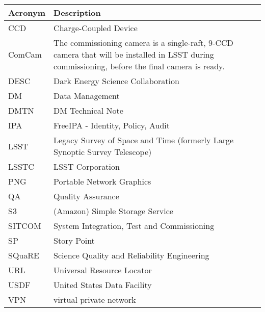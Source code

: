 \addtocounter{table}{-1}
\begin{longtable}{p{}p{}}\hline
\textbf{Acronym} & \textbf{Description}  \\\hline

CCD & Charge-Coupled Device \\\hline
ComCam & The commissioning camera is a single-raft, 9-CCD camera that will be installed in LSST during commissioning, before the final camera is ready. \\\hline
DESC & Dark Energy Science Collaboration \\\hline
DM & Data Management \\\hline
DMTN & DM Technical Note \\\hline
IPA & FreeIPA - Identity, Policy, Audit \\\hline
LSST & Legacy Survey of Space and Time (formerly Large Synoptic Survey Telescope) \\\hline
LSSTC & LSST Corporation \\\hline
PNG & Portable Network Graphics \\\hline
QA & Quality Assurance \\\hline
S3 & (Amazon) Simple Storage Service \\\hline
SITCOM & System Integration, Test and Commissioning \\\hline
SP & Story Point \\\hline
SQuaRE & Science Quality and Reliability Engineering \\\hline
URL & Universal Resource Locator \\\hline
USDF & United States Data Facility \\\hline
VPN & virtual private network \\\hline
\end{longtable}
